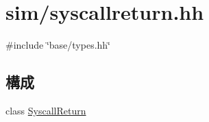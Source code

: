 \hypertarget{syscallreturn_8hh}{
\section{sim/syscallreturn.hh}
\label{syscallreturn_8hh}
}
{\ttfamily \#include \char`\"{}base/types.hh\char`\"{}}\par
\subsection*{構成}
\begin{DoxyCompactItemize}
\item 
class \hyperlink{classSyscallReturn}{SyscallReturn}
\end{DoxyCompactItemize}
